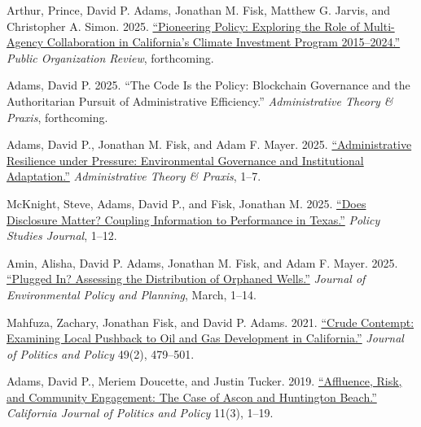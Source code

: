 \documentclass[12pt,letterpaper]{article}
\renewenvironment{itemize}{
  \begin{list}{}{
    \setlength{\leftmargin}{1.5em}
    \setlength{\itemsep}{0.25em}
    \setlength{\parskip}{0pt}
    \setlength{\parsep}{0.25em}
  }
}{
  \end{list}
}
\begin{document}
\begin{itemize}\leftmargin=2pt\itemindent=-15pt\leftmargin=2pt\itemindent=-15pt

    \item Arthur, Prince, David P. Adams, Jonathan M. Fisk, Matthew G. Jarvis, and Christopher A. Simon. 2025. \href{https://doi.org/10.1007/s11115-025-00586-3}{``Pioneering Policy: Exploring the Role of Multi-Agency Collaboration in California's Climate Investment Program 2015--2024.''} \emph{Public Organization Review}, forthcoming.

    \item Adams, David P. 2025. ``The Code Is the Policy: Blockchain Governance and the Authoritarian Pursuit of Administrative Efficiency.'' \emph{Administrative Theory \& Praxis}, forthcoming.

    \item Adams, David P., Jonathan M. Fisk, and Adam F. Mayer. 2025. \href{https://doi.org/10.1080/10841806.2025.2537600}{``Administrative Resilience under Pressure: Environmental Governance and Institutional Adaptation.''} \emph{Administrative Theory \& Praxis}, 1--7.

    \item McKnight, Steve, Adams, David P., and Fisk, Jonathan M. 2025. \href{https://doi.org/10.1111/psj.70064}{``Does Disclosure Matter? Coupling Information to Performance in Texas.''} \emph{Policy Studies Journal}, 1--12.

    \item Amin, Alisha, David P. Adams, Jonathan M. Fisk, and Adam F. Mayer. 2025. \href{https://doi.org/10.1080/1523908X.2025.2480289}{``Plugged In? Assessing the Distribution of Orphaned Wells.''} \emph{Journal of Environmental Policy and Planning}, March, 1--14.

    \item Mahfuza, Zachary, Jonathan Fisk, and David P. Adams. 2021. \href{https://doi.org/10.1111/polp.12401}{``Crude Contempt: Examining Local Pushback to Oil and Gas Development in California.''} \emph{Journal of Politics and Policy} 49(2), 479--501.

    \item Adams, David P., Meriem Doucette, and Justin Tucker. 2019. \href{https://escholarship.org/uc/item/2mz2n6qk}{``Affluence, Risk, and Community Engagement: The Case of Ascon and Huntington Beach.''} \emph{California Journal of Politics and Policy} 11(3), 1--19.   

\end{itemize}
\end{document}
